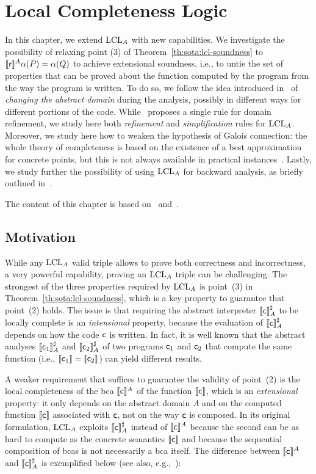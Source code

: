 
\chapter{Local Completeness Logic}\label{ch:lcla}
In this chapter, we extend $\text{LCL}_A$ with new capabilities. We investigate the possibility of relaxing point (3) of Theorem~\ref{th:sota:lcl-soundness} to $\llbracket\mathsf{r}\rrbracket^{A} \alpha(P) = \alpha(Q)$ to achieve extensional soundness, i.e., to untie the set of properties that can be proved about the function computed by the program from the way the program is written. To do so, we follow the idea introduced in~\cite[§8]{BGGR23} of \emph{changing the abstract domain} during the analysis, possibly in different ways for different portions of the code.
While~\cite{BGGR23} proposes a single rule for domain refinement, we study here both \emph{refinement} and \emph{simplification} rules for $\text{LCL}_A$.
Moreover, we study here how to weaken the hypothesis of Galois connection: the whole theory of completeness is based on the existence of a best approximation for concrete points, but this is not always available in practical instances~\cite{CC92}.
Lastly, we study further the possibility of using $\text{LCL}_A$ for backward analysis, as briefly outlined in~\cite[\S 5.3]{BGGR23}.

The content of this chapter is based on~\cite{ABG23} and~\cite[\S 6]{ABGL24}.

\section{Motivation}
While any $\text{LCL}_A$ valid triple allows to prove both correctness and incorrectness, a very powerful capability, proving an $\text{LCL}_A$ triple can be challenging.
The strongest of the three properties required by $\text{LCL}_A$ is point~(3) in Theorem~\ref{th:sota:lcl-soundness}, which is a key property to guarantee that point~(2) holds.
The issue is that requiring the abstract interpreter $\llbracket\mathsf{c}\rrbracket^{\sharp}_{A}$ to be locally complete is an \emph{intensional} property, because the evaluation of $\llbracket\mathsf{c}\rrbracket^{\sharp}_{A}$ depends on how the code $\mathsf{c}$ is written.
In fact, it is well known that the abstract analyses $\llbracket\mathsf{c}_1\rrbracket^{\sharp}_{A}$ and $\llbracket\mathsf{c}_2\rrbracket^{\sharp}_{A}$ of two programs $\mathsf{c}_1$ and $\mathsf{c}_2$ that compute the same function (i.e., $\llbracket\mathsf{c}_1\rrbracket=\llbracket\mathsf{c}_2\rrbracket$) can yield different results.

A weaker requirement that suffices to guarantee the validity of point~(2) is the local completeness of the bca $\llbracket\mathsf{c}\rrbracket^{A}$ of the function $\llbracket\mathsf{c}\rrbracket$, which is an \emph{extensional} property: it only depends on the abstract domain $A$ and on the computed function $\llbracket\mathsf{c}\rrbracket$ associated with $\mathsf{c}$, not on the way $\mathsf{c}$ is composed. In its original formulation, $\text{LCL}_A$ exploits $\llbracket\mathsf{c}\rrbracket^{\sharp}_{A}$ instead of $\llbracket\mathsf{c}\rrbracket^{A}$ because the second can be as hard to compute as the concrete semantics $\llbracket\mathsf{c}\rrbracket$ and because the sequential composition of bcas is not necessarily a bca itself.
The difference between $\llbracket\mathsf{c}\rrbracket^{A}$ and $\llbracket\mathsf{c}\rrbracket^{\sharp}_{A}$ is exemplified below (see also, e.g.,~\cite[Example~1]{LL09}):


